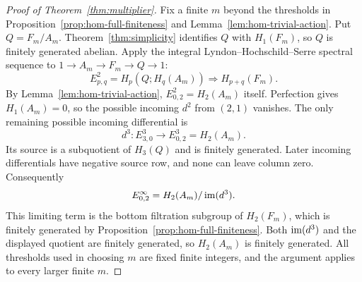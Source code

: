 \begin{proof}[Proof of Theorem~\ref{thm:multiplier}]
Fix a finite $m$ beyond the thresholds in
Proposition~\ref{prop:hom-full-finiteness} and
Lemma~\ref{lem:hom-trivial-action}.  Put $Q=F_m/A_m$.
Theorem~\ref{thm:simplicity} identifies $Q$ with $H_1(F_m)$,
so $Q$ is finitely generated abelian.  Apply the integral
Lyndon--Hochschild--Serre spectral sequence
\cite[6.8.2, pp.~195--196]{Weibel1994} to
$1\to A_m\to F_m\to Q\to1$:
\[
 E^2_{p,q}=H_p(Q;H_q(A_m))\Longrightarrow H_{p+q}(F_m).
\]
By Lemma~\ref{lem:hom-trivial-action},
$E^2_{0,2}=H_2(A_m)$ itself.  Perfection gives
$H_1(A_m)=0$, so the possible incoming $d^2$ from $(2,1)$
vanishes.  The only remaining possible incoming differential is
\[
 d^3:E^3_{3,0}\longrightarrow E^3_{0,2}=H_2(A_m).
\]
Its source is a subquotient of $H_3(Q)$ and is finitely
generated.  Later incoming differentials have negative source
row, and none can leave column zero.  Consequently
\[
 E^\infty_{0,2}=H_2(A_m)/\operatorname{im}(d^3).
\]
This limiting term is the bottom filtration subgroup of
$H_2(F_m)$, which is finitely generated by
Proposition~\ref{prop:hom-full-finiteness}.  Both
$\operatorname{im}(d^3)$ and the displayed quotient are finitely generated,
so $H_2(A_m)$ is finitely generated.  All thresholds used in
choosing $m$ are fixed finite integers, and the argument applies
to every larger finite $m$.
\end{proof}
